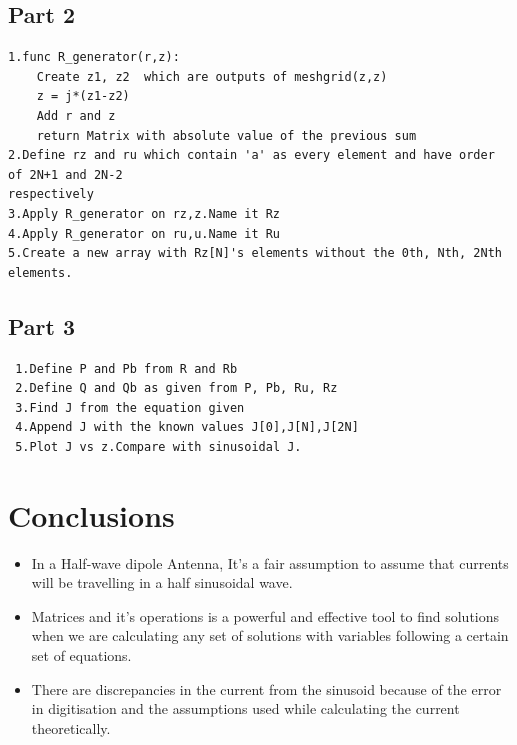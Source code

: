 \documentclass[12pt, a4paper]{report}
\begin{document}
\subsection*{Part 2}
\begin{Verbatim}
1.func R_generator(r,z):
	Create z1, z2  which are outputs of meshgrid(z,z)
	z = j*(z1-z2)
	Add r and z
	return Matrix with absolute value of the previous sum
2.Define rz and ru which contain 'a' as every element and have order of 2N+1 and 2N-2 
respectively
3.Apply R_generator on rz,z.Name it Rz
4.Apply R_generator on ru,u.Name it Ru
5.Create a new array with Rz[N]'s elements without the 0th, Nth, 2Nth elements.
\end{Verbatim}

\subsection*{Part 3}
\begin{Verbatim}
 1.Define P and Pb from R and Rb
 2.Define Q and Qb as given from P, Pb, Ru, Rz
 3.Find J from the equation given
 4.Append J with the known values J[0],J[N],J[2N]
 5.Plot J vs z.Compare with sinusoidal J.
 \end{Verbatim}


 
 
  \section*{Conclusions}
  \begin{itemize}
  \item In a Half-wave dipole Antenna, It's a fair assumption to assume that currents will be travelling in a half sinusoidal wave.
  \item Matrices and it's operations is a powerful and effective tool to find solutions when we are calculating any set of solutions with variables following a certain set of equations. 
  \item There are discrepancies in the current from the sinusoid because of the error in digitisation and the assumptions used while calculating the current theoretically.
  \end{itemize}
 
\end{document}
